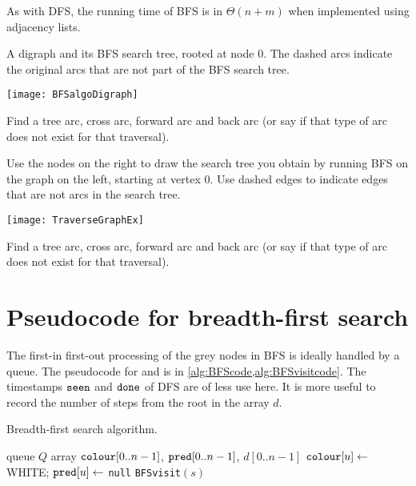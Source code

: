 As with DFS, the running time of BFS is in $\Theta(n+m)$ when implemented using adjacency lists.

\begin{Boxample}[4]
A digraph and its BFS search tree, rooted at node $0$. 
The dashed arcs indicate the original arcs that are not part of the BFS search tree.
\begin{center}
  \texttt{[image: BFSalgoDigraph]} 
\end{center}
Find a tree arc, cross arc, forward arc and back arc (or say if that type of arc does not exist for that traversal).
\end{Boxample}

\begin{Boxample}[2]
Use the nodes on the right to draw the search tree you obtain by running BFS on the graph on the left, starting at vertex $0$. 
Use dashed edges to indicate edges that are not arcs in the search tree.
\begin{center}
  \texttt{[image: TraverseGraphEx]}
\end{center}
Find a tree arc, cross arc, forward arc and back arc (or say if that type of arc does not exist for that traversal).
\end{Boxample}
 
\section{Pseudocode for breadth-first search} \label{sec:bfs}
The first-in first-out processing of the grey nodes in BFS is ideally handled by a queue. 
The pseudocode for  and  is in \cref{alg:BFScode,alg:BFSvisitcode}.
The time\-stamps $\operatorname{\text{\texttt{seen}}}$ and $\operatorname{\text{\texttt{done}}}$ of DFS are of less use here. 
It is more useful to record the number of steps from the root in the array $d$.

\begin{algorithm}[H]
  \caption{Breadth-first search algorithm.}
    \label{alg:BFScode}
\begin{algorithmic}[1]
	\State queue $Q$  
	\State array $\operatorname{\text{\texttt{colour}}}[0..n-1]$, $\operatorname{\text{\texttt{pred}}}[0..n-1]$, $d[0..n-1]$
		\State $\operatorname{\text{\texttt{colour}}}[u] \gets $ WHITE; $\operatorname{\text{\texttt{pred}}}[u] \gets $ \texttt{null}
	\EndFor
			\State \texttt{BFSvisit}$(s)$
		\EndIf
	\EndFor
	\State {}
\EndFunction
\end{algorithmic}
\end{algorithm}

